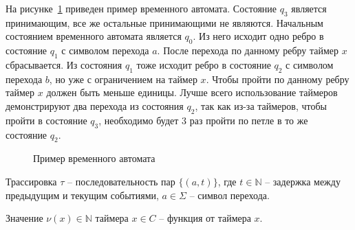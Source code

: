 \documentclass[times,specification,annotation]{itmo-student-thesis}
\begin{document}
\begin{example}
  На рисунке~\ref{time_automaton} приведен пример временного автомата. 
  Состояние $q_3$ является принимающим, все же остальные принимающими не являются. 
  Начальным состоянием временного автомата является $q_0$. 
  Из него исходит одно ребро в состояние $q_1$ с символом перехода $a$. 
  После перехода по данному ребру таймер $x$ сбрасывается. 
  Из состояния $q_1$ тоже исходит ребро в состояние $q_2$ с символом перехода $b$, но уже с ограничением на таймер $x$.
  Чтобы пройти по данному ребру таймер $x$ должен быть меньше единицы.
  Лучше всего использование таймеров демонстрируют два перехода из состояния $q_2$, так как из-за таймеров, 
  чтобы пройти в состояние $q_3$, необходимо будет 3 раз пройти по петле в то же состояние $q_2$.
  \label{time_aut_example}
\end{example}

\begin{figure}[!h]
\caption{Пример временного автомата}\label{time_automaton}
\centering
{}
\end{figure}

\begin{definition}
  Трассировка $\tau$ -- последовательность пар $\{\left( a, t \right)\}$, 
  где $t \in \mathbb{N}$ -- задержка между предыдущим и текущим событиями, $a \in \Sigma$ -- символ перехода.
\end{definition}

\begin{definition}
  Значение $\nu(x) \in \mathbb{N}$ таймера $x \in C$ -- функция от таймера $x$.
\end{definition}
\end{document}
